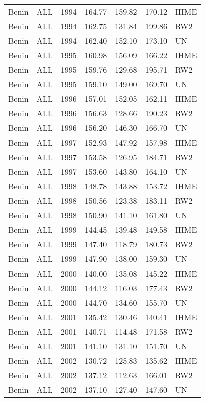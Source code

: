 \begin{longtable}{lllrrrl}
  Benin & ALL & 1994 & 164.77 & 159.82 & 170.12 & IHME \\ 
  Benin & ALL & 1994 & 162.75 & 131.84 & 199.86 & RW2 \\ 
  Benin & ALL & 1994 & 162.40 & 152.10 & 173.10 & UN \\ 
  Benin & ALL & 1995 & 160.98 & 156.09 & 166.22 & IHME \\ 
  Benin & ALL & 1995 & 159.76 & 129.68 & 195.71 & RW2 \\ 
  Benin & ALL & 1995 & 159.10 & 149.00 & 169.70 & UN \\ 
  Benin & ALL & 1996 & 157.01 & 152.05 & 162.11 & IHME \\ 
  Benin & ALL & 1996 & 156.63 & 128.66 & 190.23 & RW2 \\ 
  Benin & ALL & 1996 & 156.20 & 146.30 & 166.70 & UN \\ 
  Benin & ALL & 1997 & 152.93 & 147.92 & 157.98 & IHME \\ 
  Benin & ALL & 1997 & 153.58 & 126.95 & 184.71 & RW2 \\ 
  Benin & ALL & 1997 & 153.60 & 143.80 & 164.10 & UN \\ 
  Benin & ALL & 1998 & 148.78 & 143.88 & 153.72 & IHME \\ 
  Benin & ALL & 1998 & 150.56 & 123.38 & 183.11 & RW2 \\ 
  Benin & ALL & 1998 & 150.90 & 141.10 & 161.80 & UN \\ 
  Benin & ALL & 1999 & 144.45 & 139.48 & 149.58 & IHME \\ 
  Benin & ALL & 1999 & 147.40 & 118.79 & 180.73 & RW2 \\ 
  Benin & ALL & 1999 & 147.90 & 138.00 & 159.30 & UN \\ 
  Benin & ALL & 2000 & 140.00 & 135.08 & 145.22 & IHME \\ 
  Benin & ALL & 2000 & 144.12 & 116.03 & 177.43 & RW2 \\ 
  Benin & ALL & 2000 & 144.70 & 134.60 & 155.70 & UN \\ 
  Benin & ALL & 2001 & 135.42 & 130.46 & 140.41 & IHME \\ 
  Benin & ALL & 2001 & 140.71 & 114.48 & 171.58 & RW2 \\ 
  Benin & ALL & 2001 & 141.10 & 131.10 & 151.70 & UN \\ 
  Benin & ALL & 2002 & 130.72 & 125.83 & 135.62 & IHME \\ 
  Benin & ALL & 2002 & 137.12 & 112.63 & 166.01 & RW2 \\ 
  Benin & ALL & 2002 & 137.10 & 127.40 & 147.60 & UN \\ 

\end{longtable}
